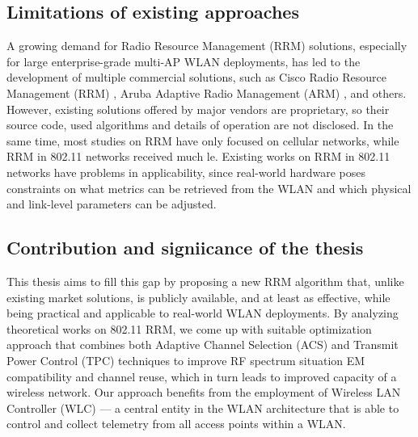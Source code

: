 \subsection{Limitations of existing approaches}
A growing demand for Radio Resource Management (RRM) solutions, especially for large enterprise-grade multi-AP WLAN deployments, has led to the development of multiple commercial solutions, such as Cisco Radio Resource Management (RRM) \cite{ciscoCiscoRadioResource}, Aruba Adaptive Radio Management (ARM) \cite{arubaAdaptiveRadioManagement}, and others. However, existing solutions offered by major vendors are proprietary, so their source code, used algorithms and details of operation are not disclosed.
In the same time, most studies on RRM have only focused on cellular networks, while RRM in 802.11 networks received much le. Existing works on RRM in 802.11 networks have problems in applicability, since real-world hardware poses constraints on what metrics can be retrieved from the WLAN and which physical and link-level parameters can be adjusted.
\subsection{Contribution and signiicance of the thesis}
This thesis aims to fill this gap by proposing a new RRM algorithm that, unlike existing market solutions, is publicly available, and at least as effective, while being practical and applicable to real-world WLAN deployments.
By analyzing theoretical works on 802.11 RRM, we come up with suitable optimization approach that combines both Adaptive Channel Selection (ACS) and Transmit Power Control (TPC) techniques to improve RF spectrum situation EM compatibility and channel reuse, which in turn leads to improved capacity of a wireless network.
Our approach benefits from the employment of Wireless LAN Controller (WLC) — a central entity in the WLAN architecture that is able to control and collect telemetry from all access points within a WLAN.


